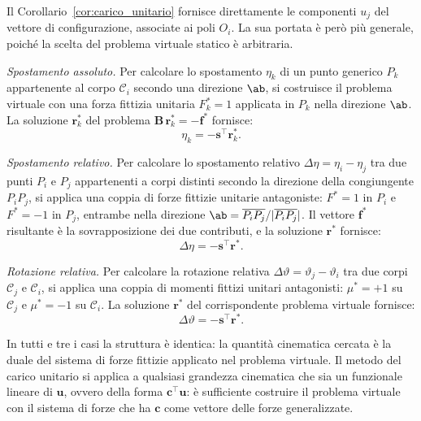 \begin{oss}
	Il Corollario~\ref{cor:carico_unitario} fornisce
	direttamente le componenti $u_j$ del vettore di
	configurazione, associate ai poli $O_i$. La sua
	portata è però più generale, poiché la scelta del
	problema virtuale statico è arbitraria.
	
	\medskip
	\noindent\textit{Spostamento assoluto.}
	Per calcolare lo spostamento $\eta_k$ di un punto
	generico $P_k$ appartenente al corpo $\mathcal{C}_i$
	secondo una direzione $\ab$, si costruisce il
	problema virtuale con una forza fittizia unitaria
	$F_k^* = 1$ applicata in $P_k$ nella direzione
	$\ab$. La soluzione $\bm{r}^*_k$ del problema
	$\bm{B}\,\bm{r}^*_k = -\bm{f}^*$ fornisce:
	\begin{equation}\label{eq:carico_unitario_gen}
		\eta_k = -\bm{s}^{\top}\bm{r}^*_k.
	\end{equation}
	
	\medskip
	\noindent\textit{Spostamento relativo.}
	Per calcolare lo spostamento relativo
	$\Delta\eta = \eta_i - \eta_j$ tra due punti $P_i$
	e $P_j$ appartenenti a corpi distinti secondo la
	direzione della congiungente $P_iP_j$, si applica
	una coppia di forze fittizie unitarie antagoniste:
	$F^* = 1$ in $P_i$ e $F^* = -1$ in $P_j$, entrambe
	nella direzione $\ab = \overline{P_iP_j}/
	\lvert\overline{P_iP_j}\rvert$. Il vettore $\bm{f}^*$
	risultante è la sovrapposizione dei due contributi,
	e la soluzione $\bm{r}^*$ fornisce:
	\begin{equation}\label{eq:scorrimento_relativo}
		\Delta\eta = -\bm{s}^{\top}\bm{r}^*.
	\end{equation}
	
	\medskip
	\noindent\textit{Rotazione relativa.}
	Per calcolare la rotazione relativa
	$\Delta\vartheta = \vartheta_j - \vartheta_i$
	tra due corpi $\mathcal{C}_j$ e $\mathcal{C}_i$,
	si applica una coppia di momenti fittizi unitari
	antagonisti: $\mu^* = +1$ su $\mathcal{C}_j$ e
	$\mu^* = -1$ su $\mathcal{C}_i$. La soluzione
	$\bm{r}^*$ del corrispondente problema virtuale
	fornisce:
	\begin{equation}\label{eq:rotazione_relativa}
		\Delta\vartheta = -\bm{s}^{\top}\bm{r}^*.
	\end{equation}
	
	\medskip\noindent
	In tutti e tre i casi la struttura è identica: la
	quantità cinematica cercata è la duale del sistema
	di forze fittizie applicato nel problema virtuale.
	Il metodo del carico unitario si applica a qualsiasi
	grandezza cinematica che sia un funzionale lineare
	di $\bm{u}$, ovvero della forma $\bm{c}^{\top}\bm{u}$:
	è sufficiente costruire il problema virtuale con il
	sistema di forze che ha $\bm{c}$ come vettore delle
	forze generalizzate.
\end{oss}


